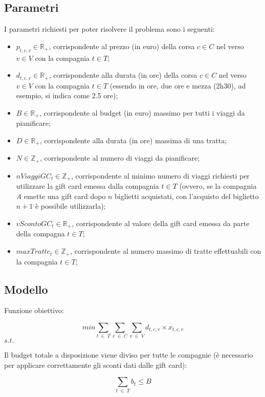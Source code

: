 \documentclass[main.tex]{subfiles}
\begin{document}
\subsection{Parametri}
I parametri richiesti per poter risolvere il problema sono i seguenti:
\begin{itemize}
    \item $p_{t,c,v} \in \mathbb{R}_+$, corrispondente al prezzo (in euro) della corsa $c \in C$ nel verso $v \in V$ con la compagnia $t \in T$;
    \item $d_{t,c,v} \in \mathbb{R}_+$, corrispondente alla durata (in ore) della corsa $c \in C$ nel verso $v \in V$ con la compagnia $t \in T$ (essendo in ore, due ore e mezza (2h30), ad esempio, si indica come 2.5 ore);
    \item $B \in \mathbb{R}_+$, corrispondente al budget (in euro) massimo per tutti i viaggi da pianificare;
    \item $D \in \mathbb{R}_+$, corrispondente alla durata (in ore) massima di una tratta;
    \item $N \in \mathbb{Z}_+$, corrispondente al numero di viaggi da pianificare;
    \item $nViaggiGC_t \in \mathbb{Z}_+$, corrispondente al minimo numero di viaggi richiesti per utilizzare la gift card emessa dalla compagnia $t \in T$
    (ovvero, se la compagnia \textit{A} emette una gift card dopo $n$ biglietti acquistati, con l'acquisto del biglietto $n+1$ è possibile utilizzarla);
    \item $vScontoGC_t \in \mathbb{R}_+$, corrispondente al valore della gift card emessa da parte della compagna $t \in T$;
    \item $maxTratte_t \in \mathbb{Z}_+$, corrispondente al numero massimo di tratte effettuabili con la compagnia $t \in T$;
\end{itemize}

\subsection{Modello}
\setlength{\parindent}{0em}
Funzione obiettivo:
\begin{tcolorbox}
$$min \sum_{t\; \in\; T} \sum_{c\; \in\; C} \sum_{v\; \in\; V} d_{t,c,v} \times{} x_{t,c,v}$$
$s.t.$
\end{tcolorbox}

Il budget totale a disposizione viene diviso per tutte le compagnie (è necessario per applicare correttamente gli sconti dati dalle gift card):
\begin{tcolorbox}
$$\sum_{t\; \in\; T} b_t \leq B$$
\end{tcolorbox}
\end{document}
